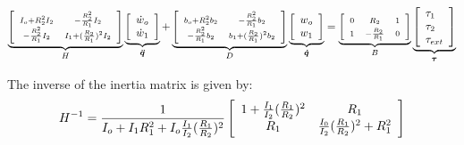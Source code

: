 \begin{align}
\underbrace{ 
\left[
\begin{array}{c c}
 \scriptstyle I_o + R_2^2 I_2           & \scriptstyle - \frac{R_2^2}{R_1} I_2       \\
 \scriptstyle - \frac{R_2^2}{R_1} I_2   & \scriptstyle I_1 + (\frac{R_2}{R_1})^2 I_2  \\
\end{array}
\right] }_{H}
\underbrace{ 
\left[
\begin{array}{l}
\dot{w}_o     \\
\dot{w}_1      \\
\end{array}
\right]}_{\vec{\ddot{q}}}
+
\underbrace{
\left[
\begin{array}{c c}
 \scriptstyle b_o + R_2^2 b_2           & \scriptstyle - \frac{R_2^2}{R_1} b_2       \\
 \scriptstyle- \frac{R_2^2}{R_1} b_2   & \scriptstyle b_1 + (\frac{R_2}{R_1})^2 b_2  \\
\end{array}
\right]
}_{D}
\underbrace{ 
\left[
\begin{array}{l}
w_o     \\
w_1      \\
\end{array}
\right]}_{\vec{\dot{q}}}
=
\underbrace{ 
\left[
\begin{array}{c c c}
 \scriptstyle 0 & \scriptstyle R_2              & \scriptstyle 1 \\
 \scriptstyle 1 & \scriptstyle -\frac{R_2}{R_1} & \scriptstyle 0
\end{array}
\right]}_{B}
\underbrace{
\left[
\begin{array}{l}
 \tau_{1} \\
 \tau_{2} \\
 \tau_{ext}
\end{array}
\right] }_{\vec{\tau}}
\label{eq:dsdm_manip}
\end{align}

The inverse of the inertia matrix is given by:
\begin{align}
H^{-1} = 
\frac{1}{I_o + I_1 R_1 ^2 + I_o \frac{ I_1 }{ I_2 } (\frac{R_1}{R_2})^2}
\left[
\begin{array}{c c}
1 + \frac{ I_1 }{ I_2 } (\frac{R_1}{R_2})^2  & R_1    \\
R_1 & \frac{ I_0 }{ I_2 } (\frac{R_1}{R_2})^2 + R_1^2 \\
\end{array}
\right]
\end{align}

